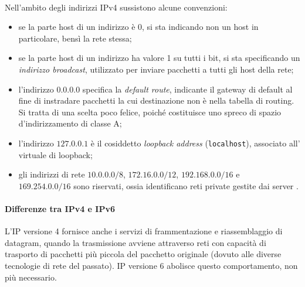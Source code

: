 \documentclass[a4paper, twoside]{article}
\def\code#1{\texttt{#1}}
\def\vedi#1{\nameref{#1}}
\begin{document}
\ \\Nell'ambito degli indirizzi IPv4 sussistono alcune convenzioni:
\begin{itemize}
\item se la parte host di un indirizzo è 0, si sta indicando non un host in particolare, bensì la rete stessa;
\item se la parte host di un indirizzo ha valore 1 su tutti i bit, si sta specificando un \textit{indirizzo broadcast}, utilizzato per inviare pacchetti a tutti gli host della rete;
\item l'indirizzo $0.0.0.0$ specifica la \textit{default route}, indicante il gateway di default al fine di instradare pacchetti la cui destinazione non è nella tabella di routing. Si tratta di una scelta poco felice, poiché costituisce uno spreco di spazio d'indirizzamento di classe A;
\item l'indirizzo $127.0.0.1$ è il cosiddetto \textit{loopback address} (\code{localhost}), associato all'\vedi{Interfaccia di rete} virtuale di loopback;
\item gli indirizzi di rete $10.0.0.0/8$, $172.16.0.0/12$, $192.168.0.0/16$ e\\ $169.254.0.0/16$ sono riservati, ossia identificano reti private gestite dai server \vedi{NAT}.
\end{itemize}

\paragraph{Differenze tra IPv4 e IPv6}
L’IP versione 4 fornisce anche i servizi di frammentazione e riassemblaggio di datagram, quando la trasmissione avviene attraverso reti con capacità di trasporto di pacchetti più piccola del pacchetto originale (dovuto alle diverse tecnologie di rete del passato). IP versione 6 abolisce questo comportamento, non più necessario. %
\end{document}
